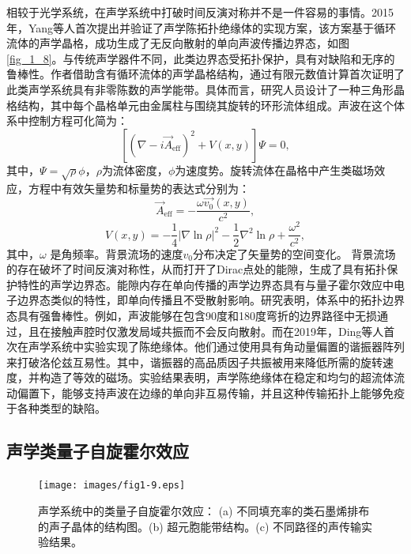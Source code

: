 相较于光学系统，在声学系统中打破时间反演对称并不是一件容易的事情。2015年，Yang等人首次提出并验证了声学陈拓扑绝缘体的实现方案\cite{i1}，该方案基于循环流体的声学晶格，成功生成了无反向散射的单向声波传播边界态，如图 \ref{fig_1_8}。与传统声学器件不同，此类边界态受拓扑保护，具有对缺陷和无序的鲁棒性。作者借助含有循环流体的声学晶格结构，通过有限元数值计算首次证明了此类声学系统具有非零陈数的声学能带。具体而言，研究人员设计了一种三角形晶格结构，其中每个晶格单元由金属柱与围绕其旋转的环形流体组成。声波在这个体系中控制方程可化简为：
\begin{equation} \label{eq1-10}
    \left[ (\nabla - i \vec{A}_{\text{eff}})^2 + V(x, y) \right] \Psi = 0,
\end{equation}  
其中，$\Psi = \sqrt{\rho} \phi$，$\rho$为流体密度，$\phi$为速度势。旋转流体在晶格中产生类磁场效应，方程中有效矢量势和标量势的表达式分别为：  
\begin{equation} \label{eq1-11}
    \vec{A}_{\text{eff}} = -\frac{\omega \vec{v_0}(x, y)}{c^2},
\end{equation}
\begin{equation} \label{eq1-12}
    V(x, y) = -\frac{1}{4} \left|\nabla \ln \rho\right|^2 - \frac{1}{2} \nabla^2 \ln \rho + \frac{\omega^2}{c^2},
\end{equation}
其中，\(\omega\) 是角频率。背景流场的速度$v_0$分布决定了矢量势的空间变化。
背景流场的存在破坏了时间反演对称性，从而打开了Dirac点处的能隙，生成了具有拓扑保护特性的声学边界态。能隙内存在单向传播的声学边界态具有与量子霍尔效应中电子边界态类似的特性，即单向传播且不受散射影响。研究表明，体系中的拓扑边界态具有强鲁棒性。例如，声波能够在包含90度和180度弯折的边界路径中无损通过，且在接触声腔时仅激发局域共振而不会反向散射。而在2019年，Ding等人首次在声学系统中实验实现了陈绝缘体\cite{i-add-1}。他们通过使用具有角动量偏置的谐振器阵列来打破洛伦兹互易性。其中，谐振器的高品质因子共振被用来降低所需的旋转速度，并构造了等效的磁场。实验结果表明，声学陈绝缘体在稳定和均匀的超流体流动偏置下，能够支持声波在边缘的单向非互易传输，并且这种传输拓扑上能够免疫于各种类型的缺陷。

\subsection{声学类量子自旋霍尔效应}

\begin{figure}[h!]
    \centering
    \texttt{[image: images/fig1-9.eps]} 
    \caption{声学系统中的类量子自旋霍尔效应\cite{i2}：
    (a) 不同填充率的类石墨烯排布的声子晶体的结构图。(b) 超元胞能带结构。(c) 不同路径的声传输实验结果。
    }
    \label{fig_1_9}
\end{figure}


